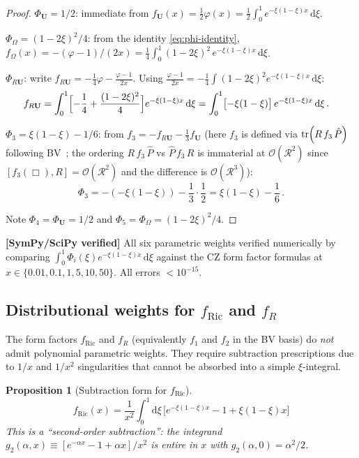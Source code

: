 \documentclass[11pt,a4paper]{article}
\renewcommand{\dd}{\mathrm{d}}
\newtheorem{proposition}[theorem]{Proposition}
\theoremstyle{definition}
\theoremstyle{remark}
\newcommand{\verified}[1]{%
  \par\noindent\colorbox{green!10}{%
    \parbox{\dimexpr\linewidth-2\fboxsep}{%
      \textcolor{green!50!black}{\textbf{[SymPy/SciPy verified]}}
      \textcolor{green!50!black}{#1}%
    }%
  }\par%
}
\begin{document}
\begin{proof}
$\Phi_{\mathbf{U}} = 1/2$: immediate from
$f_{\mathbf{U}}(x) = \frac{1}{2}\varphi(x) =
\frac{1}{2}\int_0^1 e^{-\xi(1-\xi)x}\,\dd\xi$.

$\Phi_\Omega = (1-2\xi)^2/4$: from the identity \eqref{eq:phi-identity},
$f_\Omega(x) = -(\varphi-1)/(2x) =
\frac{1}{4}\int_0^1(1-2\xi)^2\,e^{-\xi(1-\xi)x}\,\dd\xi$.

$\Phi_{R\mathbf{U}}$: write
$f_{R\mathbf{U}} = -\frac{1}{4}\varphi - \frac{\varphi-1}{2x}$.
Using $\frac{\varphi-1}{2x} = -\frac{1}{4}\int(1-2\xi)^2 e^{-\xi(1-\xi)x}\,\dd\xi$:
\begin{align*}
  f_{R\mathbf{U}} &= \int_0^1\Bigl[-\frac{1}{4}
  + \frac{(1-2\xi)^2}{4}\Bigr]e^{-\xi(1-\xi)x}\,\dd\xi
  = \int_0^1\bigl[-\xi(1-\xi)\bigr]\,e^{-\xi(1-\xi)x}\,\dd\xi\,.
\end{align*}

$\Phi_3 = \xi(1-\xi) - 1/6$: from
$f_3 = -f_{R\mathbf{U}} - \frac{1}{3}f_{\mathbf{U}}$
(here $f_3$ is defined via $\tr(R\,f_3\,\hat{P})$ following
BV~\cite{BV1987,CZ2012}; the ordering $R\,f_3\,\hat{P}$
vs $\hat{P}\,f_3\,R$ is immaterial at $\mathcal{O}(\mathcal{R}^2)$
since $[f_3(\Box), R] = \mathcal{O}(\mathcal{R}^2)$ and the difference
is $\mathcal{O}(\mathcal{R}^3)$):
\begin{equation*}
  \Phi_3 = -(-\xi(1-\xi)) - \frac{1}{3}\cdot\frac{1}{2}
  = \xi(1-\xi) - \frac{1}{6}\,.
\end{equation*}

Note $\Phi_4 = \Phi_{\mathbf{U}} = 1/2$ and
$\Phi_5 = \Phi_\Omega = (1-2\xi)^2/4$.
\end{proof}

\verified{All six parametric weights verified numerically by comparing
$\int_0^1 \Phi_i(\xi) e^{-\xi(1-\xi)x}\,\dd\xi$ against the
CZ form factor formulas at $x \in \{0.01, 0.1, 1, 5, 10, 50\}$.
All errors $< 10^{-15}$.}


\subsection{Distributional weights for $f_{\mathrm{Ric}}$ and $f_R$}

The form factors $f_{\text{Ric}}$ and $f_R$ (equivalently $f_1$ and
$f_2$ in the BV basis) do \emph{not} admit polynomial parametric weights.
They require subtraction prescriptions due to $1/x$ and $1/x^2$
singularities that cannot be absorbed into a simple $\xi$-integral.

\begin{proposition}[Subtraction form for $f_{\mathrm{Ric}}$]
\label{prop:fRic-subtraction}
\begin{equation}
  \boxed{
  f_{\mathrm{Ric}}(x)
  = \frac{1}{x^2}\int_0^1\dd\xi\,
  \bigl[e^{-\xi(1-\xi)x} - 1 + \xi(1-\xi)x\bigr]
  }
  \label{eq:fRic-subtraction}
\end{equation}
This is a ``second-order subtraction'': the integrand
$g_2(\alpha, x) \equiv [e^{-\alpha x} - 1 + \alpha x]/x^2$
is entire in $x$ with $g_2(\alpha, 0) = \alpha^2/2$.
\end{proposition}
\end{document}
